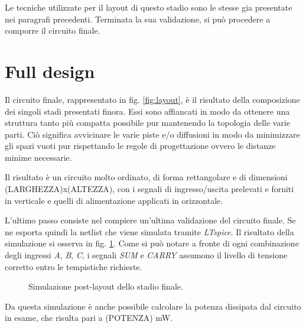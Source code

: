 Le tecniche utilizzate per il layout di questo stadio sono le stesse gia presentate nei paragrafi precedenti. Terminata la sua validazione, si può procedere a comporre il circuito finale.

\section{Full design}
\label{sec:sec_fullDesign}

Il circuito finale, rappresentato in fig. \ref{fig:layout}, è il risultato della composizione dei singoli stadi presentati finora. Essi sono affiancati in modo da ottenere una struttura tanto più compatta possibile pur mantenendo la topologia delle varie parti. Ciò significa avvicinare le varie piste e/o diffusioni in modo da minimizzare gli spazi vuoti pur rispettando le regole di progettazione ovvero le distanze minime necessarie. 

Il risultato è un circuito molto ordinato, di forma rettangolare e di dimensioni (LARGHEZZA)x(ALTEZZA), con i segnali di ingresso/uscita prelevati e forniti in verticale e quelli di alimentazione applicati in orizzontale.

L'ultimo passo consiste nel compiere un'ultima validazione del circuito finale. Se ne esporta quindi la netlist che viene simulata tramite \textit{LTspice}. Il risultato della simulazione si osserva in fig. \ref{fig:simulazioneFinale}. Come si può notare a fronte di ogni combinazione degli ingressi \textit{A}, \textit{B}, \textit{C}, i segnali \textit{SUM} e \textit{CARRY} assumono il livello di tensione corretto entro le tempistiche richieste.  

\begin{figure}[hbt!]
	\centering
	\caption{Simulazione post-layout dello stadio finale.}
	\label{fig:simulazioneFinale}
\end{figure}

Da questa simulazione è anche possibile calcolare la potenza dissipata dal circuito in esame, che risulta pari a (POTENZA) mW.






